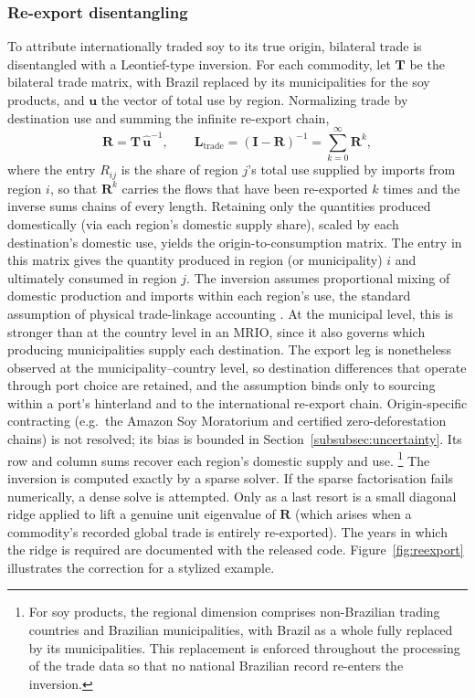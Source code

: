 \subsubsection{Re-export disentangling}\label{subsubsec:reexport}
To attribute internationally traded soy to its true origin, bilateral trade is
disentangled with a Leontief-type inversion. For each commodity, let
$\mathbf{T}$ be the bilateral trade matrix, with Brazil replaced by its
municipalities for the soy products, and $\mathbf{u}$ the vector of total
use by region. Normalizing trade by destination use and summing the infinite
re-export chain,
\begin{equation}\label{eq:reex}
  \mathbf{R}=\mathbf{T}\,\hat{\mathbf{u}}^{-1},
  \qquad
  \mathbf{L}_{\mathrm{trade}}=(\mathbf{I}-\mathbf{R})^{-1}
  =\sum_{k=0}^{\infty}\mathbf{R}^{k},
\end{equation}
where the entry $R_{ij}$ is the share of region $j$'s total use supplied by
imports from region $i$, so that $\mathbf{R}^{k}$ carries the flows that
have been re-exported $k$ times and the inverse sums chains of every length.
Retaining only the quantities produced domestically (via each region's domestic supply share), scaled by each destination's domestic use, yields the origin-to-consumption matrix. The entry in this matrix gives the quantity produced in region (or municipality) $i$ and ultimately consumed in region $j$. The inversion
assumes proportional mixing of domestic production and imports within each
region's use, the standard assumption of physical trade-linkage accounting \cite{kastner2011tracing}.
At the municipal level, this is stronger than at the country level in an MRIO, since it also governs which producing municipalities supply each destination. The export leg is nonetheless observed at the municipality–country level, so destination differences that operate through port choice are retained, and the assumption binds only to sourcing within a port's hinterland and to the international re-export chain. Origin-specific contracting (e.g.\ the Amazon
Soy Moratorium and certified zero-deforestation chains) is not resolved; its
bias is bounded in Section~\ref{subsubsec:uncertainty}.
Its row and column sums recover each region's domestic supply and use.
\footnote{For soy products, the regional dimension comprises non-Brazilian trading countries and Brazilian municipalities, with Brazil as a whole fully replaced by its municipalities. This replacement is enforced throughout the processing of the trade data so that no national Brazilian record re-enters the inversion.} The inversion is computed exactly by a sparse solver. If the sparse factorisation fails numerically, a dense solve is attempted. Only as a last resort is a small diagonal ridge applied to lift a genuine unit
eigenvalue of $\mathbf{R}$ (which arises when a commodity's recorded global
trade is entirely re-exported). The years in which the ridge is required are
documented with the released code. Figure~\ref{fig:reexport} illustrates the correction for a
stylized example.

